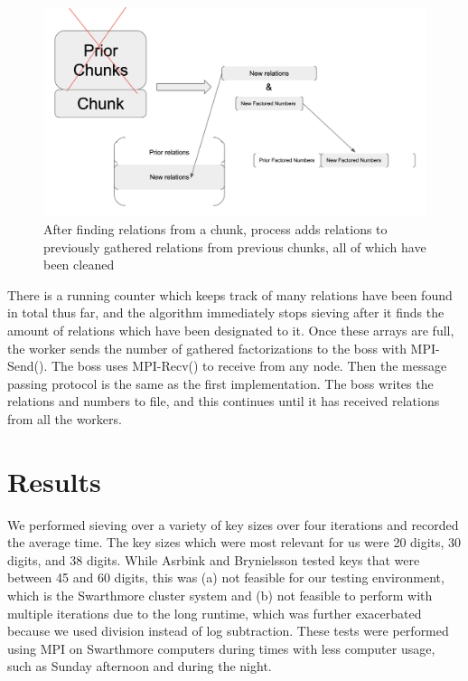 \documentclass[11pt,twocolumn]{article}
\begin{document}
\begin{figure}[!htb]
    \centering
    \includegraphics[scale = 0.2]{Para2Chunk.png}
    \caption{After finding relations from a chunk, process adds relations to previously gathered relations from previous chunks, all of which have been cleaned}
    \label{chunks}
\end{figure}


There is a running counter which keeps track of many relations have been found in total thus far, and the algorithm immediately stops sieving after it finds the amount of relations which have been designated to it. Once these arrays are full, the worker sends the number of gathered factorizations to the boss with MPI-Send(). The boss uses MPI-Recv() to receive from any node. Then the message passing protocol is the same as the first implementation. The boss writes the relations and numbers to file, and this continues until it has received relations from all the workers.


\section {Results}\label{results}
We performed sieving over a variety of key sizes over four iterations and recorded the average time. The key sizes which were most relevant for us were 20 digits, 30 digits, and 38 digits. While Asrbink and Brynielsson \cite{asbrink:parallelqs} tested keys that were between 45 and 60 digits, this was (a) not feasible for our testing environment, which is the Swarthmore cluster system and (b) not feasible to perform with multiple iterations due to the long runtime, which was further exacerbated because we used division instead of log subtraction. These tests were performed using MPI on Swarthmore computers during times with less computer usage, such as Sunday afternoon and during the night.
\end{document}
